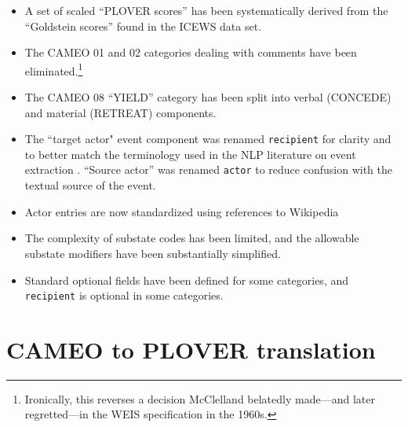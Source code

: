 \documentclass[11pt]{report}
\newcommand{\plcat}[1]{\textsf{#1}}
\newcommand{\txt}[1]{\texttt{#1}}
\newcommand{\fn}[1]{\footnote{#1}}
\begin{document}
{\begin{itemize}
\item A set of scaled ``PLOVER scores'' has been systematically derived from the ``Goldstein scores'' found in the ICEWS data set.

\item The CAMEO 01 and 02 categories dealing with comments have been eliminated.\fn{Ironically, this reverses a decision McClelland belatedly made---and later regretted---in the WEIS specification in the 1960s.}

\item The CAMEO 08 ``YIELD'' category has been split into verbal (\plcat{CONCEDE}) and material (\plcat{RETREAT}) components.

\item The ``target actor" event component was renamed \txt{recipient} for clarity and to better match the terminology used in the NLP literature on event extraction \citep{halterman2020extracting}. ``Source actor'' was renamed \txt{actor} to reduce confusion with the textual source of the event.

\item Actor entries are now standardized using references to Wikipedia

\item The complexity of substate codes has been limited, and the allowable substate modifiers have been substantially simplified.

\item Standard optional fields have been defined for some categories, and \txt{recipient} is optional in some categories.

\end{itemize}


\section{CAMEO to PLOVER translation}\label{ssec:ctp}

}
\end{document}
